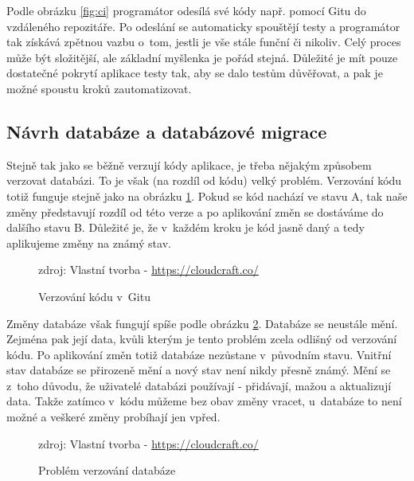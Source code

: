 Podle obrázku \ref{fig:ci} programátor odesílá své kódy např. pomocí Gitu \cite{git} do vzdáleného repozitáře. Po odeslání se automaticky spouštějí testy a programátor tak získává zpětnou vazbu o~tom, jestli je vše stále funční či nikoliv. Celý proces může být složitější, ale základní myšlenka je pořád stejná. Důležité je mít pouze dostatečné pokrytí aplikace testy tak, aby se dalo testům důvěřovat, a pak je možné spoustu kroků zautomatizovat.

\subsection{Návrh databáze a databázové migrace}
Stejně tak jako se běžně verzují kódy aplikace, je třeba nějakým způsobem verzovat databázi. To je však (na rozdíl od kódu) velký problém. Verzování kódu totiž funguje stejně jako na obrázku \ref{fig:verzGit}. Pokud se kód nachází ve stavu A, tak naše změny představují rozdíl od této verze a po aplikování změn se dostáváme do dalšího stavu B. Důležité je, že v~každém kroku je kód jasně daný a tedy aplikujeme změny na známý stav.

\begin{figure}[h]
	\centering
	\caption{Verzování kódu v~Gitu}
	\small zdroj: Vlastní tvorba - \url{https://cloudcraft.co/}
	\label{fig:verzGit}
\end{figure}

Změny databáze však fungují spíše podle obrázku \ref{fig:verzDb}. Databáze se neustále mění. Zejména pak její data, kvůli kterým je tento problém zcela odlišný od verzování kódu. Po aplikování změn totiž databáze nezůstane v~původním stavu. Vnitřní stav databáze se přirozeně mění a nový stav není nikdy přesně známý. Mění se z~toho důvodu, že uživatelé databázi používají - přidávají, mažou a aktualizují data. Takže zatímco v~kódu můžeme bez obav změny vracet, u~databáze to není možné a veškeré změny probíhají jen vpřed.

\begin{figure}[h]
	\centering
	\caption{Problém verzování databáze}
	\small zdroj: Vlastní tvorba - \url{https://cloudcraft.co/}
	\label{fig:verzDb}
\end{figure}

